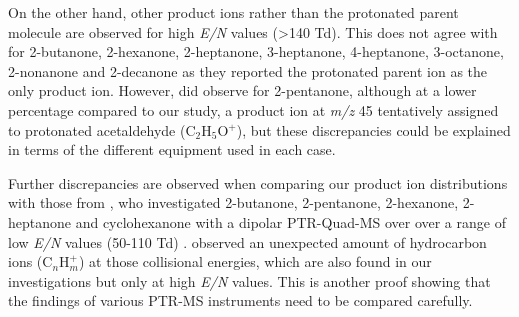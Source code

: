 On the other hand, other product ions rather than the protonated parent molecule are observed for high \textit{E/N} values (>140 Td). This does not agree with \citeauthor{buhr2002analysis} for 2-butanone, 2-hexanone, 2-heptanone, 3-heptanone, 4-heptanone, 3-octanone, 2-nonanone and 2-decanone as they  reported the protonated parent ion as the only product ion. However, \citeauthor{buhr2002analysis} did observe for 2-pentanone, although at a lower percentage compared to our study, a product ion at \textit{m/z} 45 tentatively assigned to protonated acetaldehyde (C$_2$H$_5$O$^+$), but these discrepancies could be explained in terms of the different equipment used in each case.



Further discrepancies are observed when comparing our product ion distributions with those from \citeauthor{pan2017detection}, who investigated  2-butanone, 2-pentanone, 2-hexanone, 2-heptanone and cyclohexanone with a dipolar PTR-Quad-MS over over a range of low \textit{E/N} values (50-110 Td) \cite{pan2017detection}.
\citeauthor{pan2017detection} observed an unexpected amount of hydrocarbon ions (C$_n$H$_m^+$) at those collisional energies, which are also found in our investigations but only at high \textit{E/N} values. 
This is another proof showing that the findings of various PTR-MS instruments need to be compared carefully.



